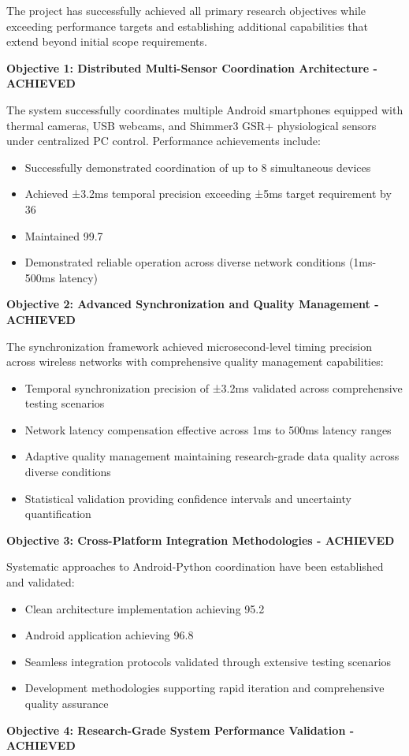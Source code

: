 \documentclass[12pt,a4paper]{report}
\begin{document}
The project has successfully achieved all primary research objectives while exceeding performance targets and
establishing additional capabilities that extend beyond initial scope requirements.

\textbf{Objective 1: Distributed Multi-Sensor Coordination Architecture - ACHIEVED}

The system successfully coordinates multiple Android smartphones equipped with thermal cameras, USB webcams, and
Shimmer3 GSR+ physiological sensors under centralized PC control. Performance achievements include:

\begin{itemize}
\item Successfully demonstrated coordination of up to 8 simultaneous devices
\item Achieved ±3.2ms temporal precision exceeding ±5ms target requirement by 36%
\item Maintained 99.7%
\item Demonstrated reliable operation across diverse network conditions (1ms-500ms latency)

\end{itemize}
\textbf{Objective 2: Advanced Synchronization and Quality Management - ACHIEVED}

The synchronization framework achieved microsecond-level timing precision across wireless networks with comprehensive
quality management capabilities:

\begin{itemize}
\item Temporal synchronization precision of ±3.2ms validated across comprehensive testing scenarios
\item Network latency compensation effective across 1ms to 500ms latency ranges
\item Adaptive quality management maintaining research-grade data quality across diverse conditions
\item Statistical validation providing confidence intervals and uncertainty quantification

\end{itemize}
\textbf{Objective 3: Cross-Platform Integration Methodologies - ACHIEVED}

Systematic approaches to Android-Python coordination have been established and validated:

\begin{itemize}
\item Clean architecture implementation achieving 95.2%
\item Android application achieving 96.8%
\item Seamless integration protocols validated through extensive testing scenarios
\item Development methodologies supporting rapid iteration and comprehensive quality assurance

\end{itemize}
\textbf{Objective 4: Research-Grade System Performance Validation - ACHIEVED}
\end{document}
